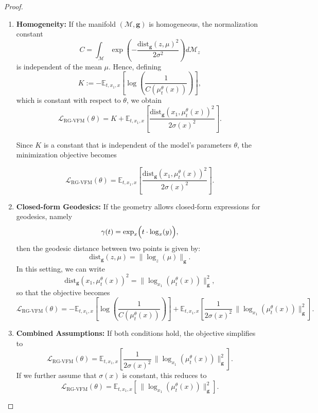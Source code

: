 \begin{proof}
\begin{enumerate}
    \item \textbf{Homogeneity:} If the manifold $(\mathcal{M}, \mathbf{g})$ is homogeneous, the normalization constant  
    $$
    C = \int_{\mathcal{M}} \exp\left(-\frac{\text{dist}_{\mathbf{g}}(z, \mu)^2}{2\sigma^2}\right) d\mathcal{M}_z
    $$  
    is independent of the mean $\mu$. Hence, defining  
    $$
    K := -\mathbb{E}_{t,x_1,x}\left[\log \left( \frac{1}{C(\mu_t^{\theta}(x))} \right)\right],
    $$  
    which is constant with respect to $\theta$, we obtain  
    $$
    \mathcal{L}_{\text{RG-VFM}} (\theta) = K + \mathbb{E}_{t,x_1,x}\left[\frac{\text{dist}_{\mathbf{g}}(x_1, \mu_t^{\theta}(x))^2}{2\sigma(x)^2}\right].
    $$  

    Since $K$ is a constant that is independent of the model's parameters $\theta$, the minimization objective becomes 

    $$
    \mathcal{L}_{\text{RG-VFM}} (\theta) =  \mathbb{E}_{t,x_1,x}\left[\frac{\text{dist}_{\mathbf{g}}(x_1, \mu_t^{\theta}(x))^2}{2\sigma(x)^2}\right].
    $$ 
    
    \item \textbf{Closed-form Geodesics:} If the geometry allows closed-form expressions for geodesics, namely  
    $$
    \gamma(t)=\exp_x\Bigl(t \cdot \log_x(y)\Bigr),
    $$  
    then the geodesic distance between two points is given by:  
    $$
    \text{dist}_{\mathbf{g}}(z, \mu) = \|\log_z(\mu)\|_{\mathbf{g}}.
    $$  
    In this setting, we can write  
    $$
    \text{dist}_{\mathbf{g}}(x_1, \mu_t^{\theta}(x))^2 = \|\log_{x_1}(\mu_t^{\theta}(x))\|_{\mathbf{g}}^2,
    $$  
    so that the objective becomes  
    $$
    \mathcal{L}_{\text{RG-VFM}} (\theta) = -\mathbb{E}_{t,x_1,x}\left[\log \left( \frac{1}{C(\mu_t^{\theta}(x))} \right)\right] + \mathbb{E}_{t,x_1,x}\left[\frac{1}{2\sigma(x)^2}\,\|\log_{x_1}(\mu_t^{\theta}(x))\|_{\mathbf{g}}^2\right].
    $$
    
    \item \textbf{Combined Assumptions:} If both conditions hold, the objective simplifies to  
    $$
    \mathcal{L}_{\text{RG-VFM}} (\theta)= \mathbb{E}_{t,x_1,x}\left[\frac{1}{2\sigma(x)^2}\,\|\log_{x_1}(\mu_t^{\theta}(x))\|_{\mathbf{g}}^2\right].
    $$  
    If we further assume that $\sigma(x)$ is constant, this reduces to  
    $$
    \mathcal{L}_{\text{RG-VFM}} (\theta) = \mathbb{E}_{t,x_1,x}\left[\,\|\log_{x_1}(\mu_t^{\theta}(x))\|_{\mathbf{g}}^2\right].
    $$
\end{enumerate}



\end{proof}


